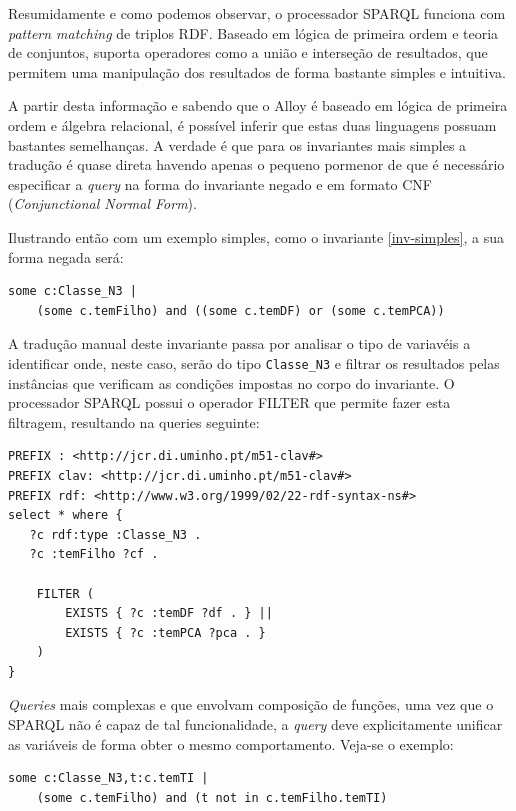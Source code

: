 \documentclass[tikz,runningheads,a4paper]{llncs}
\begin{document}
Resumidamente e como podemos observar, o processador SPARQL funciona com
\textit{pattern matching} de triplos RDF. Baseado em lógica de primeira ordem e
teoria de conjuntos, suporta operadores como a união e interseção de resultados,
que permitem uma manipulação dos resultados de forma bastante simples e
intuitiva.

A partir desta informação e sabendo que o Alloy é baseado em lógica de primeira
ordem e álgebra relacional, é possível inferir que estas duas linguagens possuam
bastantes semelhanças. A verdade é que para os invariantes mais simples a
tradução é quase direta havendo apenas o pequeno pormenor de que é necessário
especificar a \textit{query} na forma do invariante negado e em formato CNF
(\textit{Conjunctional Normal Form}).

Ilustrando então com um exemplo simples, como o invariante \ref{inv-simples}, a
sua forma negada será:

\begin{verbatim}
some c:Classe_N3 | 
    (some c.temFilho) and ((some c.temDF) or (some c.temPCA))
\end{verbatim} 

A tradução manual deste invariante passa por analisar o tipo de variavéis a
identificar onde, neste caso, serão do tipo \texttt{Classe\_N3} e filtrar os
resultados pelas instâncias que verificam as condições impostas no corpo do
invariante. O processador SPARQL possui o operador FILTER que permite fazer esta
filtragem, resultando na queries seguinte:

\begin{verbatim}
PREFIX : <http://jcr.di.uminho.pt/m51-clav#>
PREFIX clav: <http://jcr.di.uminho.pt/m51-clav#>
PREFIX rdf: <http://www.w3.org/1999/02/22-rdf-syntax-ns#>
select * where {
   ?c rdf:type :Classe_N3 .
   ?c :temFilho ?cf .

    FILTER (
        EXISTS { ?c :temDF ?df . } ||
        EXISTS { ?c :temPCA ?pca . }
    )
}
\end{verbatim} 

\textit{Queries} mais complexas e que envolvam composição de funções, uma vez
que o SPARQL não é capaz de tal funcionalidade, a \textit{query} deve
explicitamente unificar as variáveis de forma obter o mesmo comportamento.
Veja-se o exemplo:

\begin{verbatim}
some c:Classe_N3,t:c.temTI | 
    (some c.temFilho) and (t not in c.temFilho.temTI)
\end{verbatim} 
\end{document}
